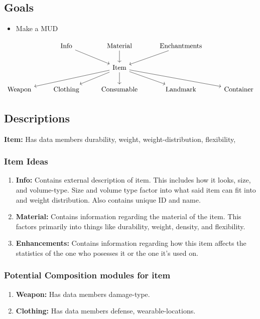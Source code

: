 \documentclass{article}
\begin{document}
\subsection*{Goals}
\begin{itemize}
    \item Make a MUD
\end{itemize}

\begin{equation*} \label{g1}
\begin{tikzcd}
    & \text{Info} \arrow[dr] & \text{Material} \arrow[d]
    & \text{Enchantments} \arrow[dl] \\
    && \text{Item} \ar[dll] \ar[dl] \ar[d] \ar[dr] \ar[drr] \\
    \text{Weapon} & \text{Clothing} & \text{Consumable} & \text{Landmark} & \text{Container}
    \end{tikzcd}
\end{equation*}

\subsection*{Descriptions}
\textbf{Item:} Has data members durability, weight, weight-distribution, flexibility, 

\subsubsection*{Item Ideas}
\begin{enumerate}
    \item \textbf{Info:} Contains external description of item. This
    includes how it looks, size, and volume-type. Size and volume type
    factor into what said item can fit into and weight distribution.  
    Also contains unique ID and name.

    \item \textbf{Material:} Contains information regarding the
    material of the item. This factors primarily into things like
    durability, weight, density, and flexibility. 

    \item \textbf{Enhancements:} Contains information regarding how
    this item affects the statistics of the one who posesses it or the
    one it's used on.
\end{enumerate}

\subsubsection*{Potential Composition modules for item }
\begin{enumerate}
    \item \textbf{Weapon:} Has data members damage-type.

    \item \textbf{Clothing:} Has data members defense, 
        wearable-locations.

\end{enumerate}
\end{document}
